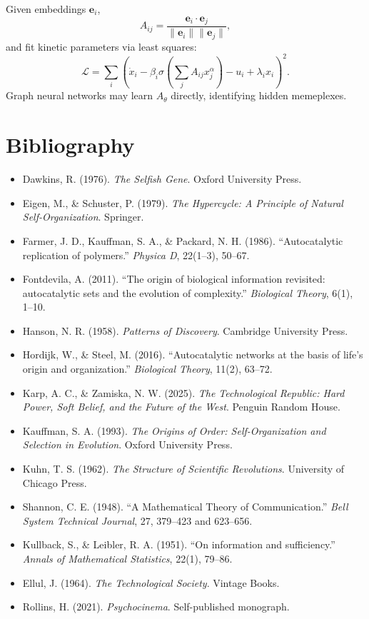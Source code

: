 \documentclass[11pt,a4paper]{article}
\begin{document}
Given embeddings \(\mathbf e_i\),
\[
A_{ij}=\frac{\mathbf e_i\!\cdot\!\mathbf e_j}
{\|\mathbf e_i\|\|\mathbf e_j\|},
\]
and fit kinetic parameters via least squares:
\[
\mathcal{L}=
\sum_i\!\left(\dot x_i
-\beta_i\sigma\!\left(\sum_jA_{ij}x_j^\alpha\right)
-u_i+\lambda_i x_i\right)^2.
\]
Graph neural networks may learn \(A_\theta\) directly, identifying hidden memeplexes.

\section*{Bibliography}

\begin{itemize}
\item Dawkins, R. (1976). \textit{The Selfish Gene}. Oxford University Press.
\item Eigen, M., \& Schuster, P. (1979). \textit{The Hypercycle: A Principle of Natural Self-Organization}. Springer.
\item Farmer, J. D., Kauffman, S. A., \& Packard, N. H. (1986). ``Autocatalytic replication of polymers.'' \textit{Physica D}, 22(1–3), 50–67.
\item Fontdevila, A. (2011). ``The origin of biological information revisited: autocatalytic sets and the evolution of complexity.'' \textit{Biological Theory}, 6(1), 1–10.
\item Hanson, N. R. (1958). \textit{Patterns of Discovery}. Cambridge University Press.
\item Hordijk, W., \& Steel, M. (2016). ``Autocatalytic networks at the basis of life’s origin and organization.'' \textit{Biological Theory}, 11(2), 63–72.
\item Karp, A. C., \& Zamiska, N. W. (2025). \textit{The Technological Republic: Hard Power, Soft Belief, and the Future of the West}. Penguin Random House.
\item Kauffman, S. A. (1993). \textit{The Origins of Order: Self-Organization and Selection in Evolution}. Oxford University Press.
\item Kuhn, T. S. (1962). \textit{The Structure of Scientific Revolutions}. University of Chicago Press.
\item Shannon, C. E. (1948). ``A Mathematical Theory of Communication.'' \textit{Bell System Technical Journal}, 27, 379–423 and 623–656.
\item Kullback, S., \& Leibler, R. A. (1951). ``On information and sufficiency.'' \textit{Annals of Mathematical Statistics}, 22(1), 79–86.
\item Ellul, J. (1964). \textit{The Technological Society}. Vintage Books.
\item Rollins, H. (2021). \textit{Psychocinema}. Self-published monograph.
\end{itemize}
\end{document}

